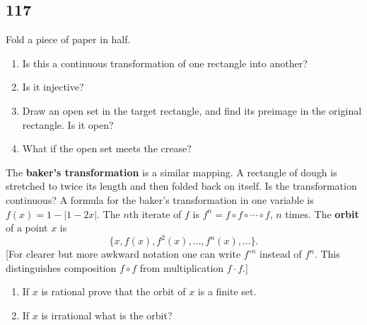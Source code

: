 \documentclass{amsart}
\begin{document}
\subsection*{117}
Fold a piece of paper in half.
\begin{enumerate}[label=(\alph*)]
\item Is this a continuous transformation of one rectangle into another?
\item Is it injective?
\item Draw an open set in the target rectangle, and find its preimage in the original rectangle. Is it open?
\item What if the open set meets the crease?
\end{enumerate}
The \textbf{baker's transformation} is a similar mapping. A rectangle of dough is stretched to twice its length and then folded back on itself. Is the transformation continuous? A formula for the baker's transformation in one variable is $f(x) = 1-|1-2x|$. The $n$th iterate of $f$ is $f^n = f \circ f \circ \cdots \circ f$, $n$ times. The \textbf{orbit} of a point $x$ is
\[
\{x, f(x), f^2(x), \ldots, f^n(x), \ldots\}.
\]
[For clearer but more awkward notation one can write $f^{\circ n}$ instead of $f^n$. This distinguishes composition $f \circ f$ from multiplication $f \cdot f$.]
\begin{enumerate}[resume,label=(\alph*)]
\item If $x$ is rational prove that the orbit of $x$ is a finite set.
\item If $x$ is irrational what is the orbit?
\end{enumerate}
\end{document}
